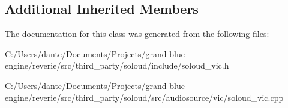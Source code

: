 \subsection*{Additional Inherited Members}


The documentation for this class was generated from the following files\+:\begin{DoxyCompactItemize}
\item 
C\+:/\+Users/dante/\+Documents/\+Projects/grand-\/blue-\/engine/reverie/src/third\+\_\+party/soloud/include/soloud\+\_\+vic.\+h\item 
C\+:/\+Users/dante/\+Documents/\+Projects/grand-\/blue-\/engine/reverie/src/third\+\_\+party/soloud/src/audiosource/vic/soloud\+\_\+vic.\+cpp\end{DoxyCompactItemize}
